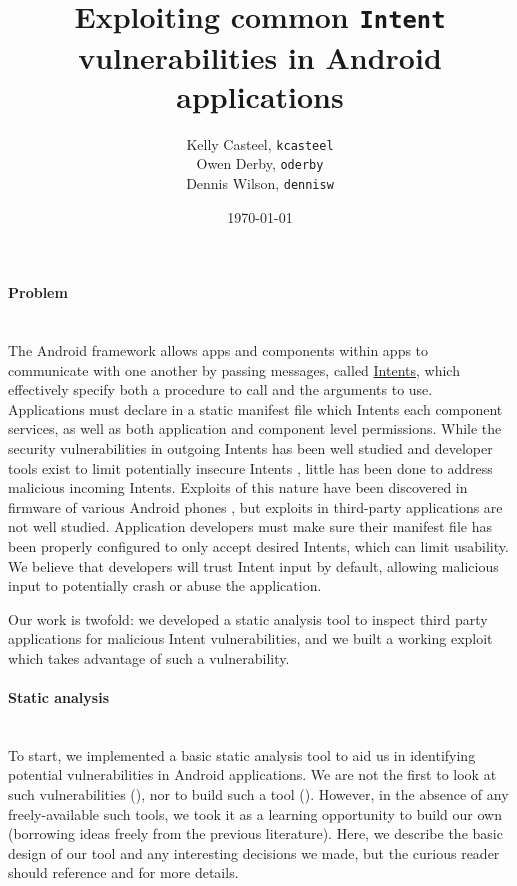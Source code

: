 \documentclass[12pt,a4paper]{article}
\title{Exploiting common \texttt{Intent} vulnerabilities in Android %
applications}
\date{\today}
\author{Kelly Casteel, \texttt{kcasteel}\\Owen Derby, \texttt{oderby}\\Dennis
 Wilson, \texttt{dennisw}}
\begin{document}
 

\maketitle

\paragraph{Problem} ~\\
The Android framework allows apps and components within apps to communicate with
one another by passing messages, called
\href{https://developer.android.com/reference/android/content/Intent.html}{Intents},
which effectively specify both a procedure to call and the arguments to
use. Applications must declare in a static manifest file which Intents each
component services, as well as both application and component level
permissions. While the security vulnerabilities in outgoing Intents has been
well studied \cite{chin_analyzing_2011} and developer tools exist to limit
potentially insecure Intents \cite{lu_chex_2012}, little has been
done to address malicious incoming Intents. Exploits of this nature have been
discovered in firmware of various Android phones \cite{grace_systematic_2012},
but exploits in third-party applications are not well studied. Application
developers must make sure their manifest file has been properly configured to
only accept desired Intents, which can limit usability. We believe that
developers will trust Intent input by default, allowing malicious input to
potentially crash or abuse the application.

Our work is twofold: we developed a static analysis tool to inspect third party
applications for malicious Intent vulnerabilities, and we built a working
exploit which takes advantage of such a vulnerability.

\paragraph{Static analysis} ~\\
To start, we implemented a basic static analysis tool to aid us in identifying
potential vulnerabilities in Android applications. We are not the first to look
at such vulnerabilities (\cite{chin_analyzing_2011}), nor to build such a tool
(\cite{grace_systematic_2012}). However, in the absence of any freely-available
such tools, we took it as a learning opportunity to build our own (borrowing
ideas freely from the previous literature). Here, we describe the basic design
of our tool and any interesting decisions we made, but the curious reader should
reference \cite{chin_analyzing_2011} and \cite{grace_systematic_2012} for more
details.
\end{document}

